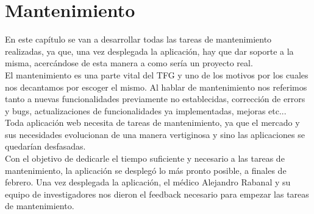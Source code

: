 \chapter{Mantenimiento}

En este capítulo se van a desarrollar todas las tareas de mantenimiento realizadas, ya que, una vez desplegada la aplicación, hay que dar soporte a la misma, acercándose de esta manera a como sería un proyecto real. \\

El mantenimiento es una parte vital del TFG y uno de los motivos por los cuales nos decantamos por escoger el mismo. Al hablar de mantenimiento nos referimos tanto a nuevas funcionalidades previamente no establecidas, corrección de errors y bugs, actualizaciones de funcionalidades ya implementadas, mejoras etc... \\

Toda aplicación web necesita de tareas de mantenimiento, ya que el mercado y sus necesidades evolucionan de una manera vertiginosa y sino las aplicaciones se quedarían desfasadas. \\

Con el objetivo de dedicarle el tiempo suficiente y necesario a las tareas de mantenimiento, la aplicación se desplegó lo más pronto posible, a finales de febrero.
Una vez desplegada la aplicación, el médico Alejandro Rabanal y su equipo de investigadores nos dieron el feedback necesario para empezar las tareas de mantenimiento. \\

